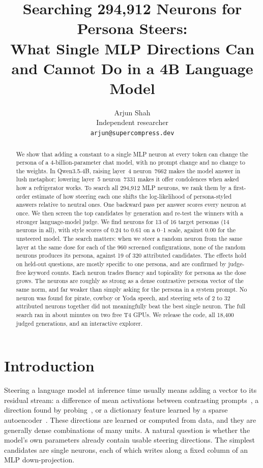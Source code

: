 \documentclass[11pt]{article}
\title{\textbf{Searching 294,912 Neurons for Persona Steers:}\\[2pt] What Single MLP Directions Can and Cannot Do in a 4B Language Model}
\author{Arjun Shah\\[2pt]\small Independent researcher\\\small\texttt{arjun@supercompress.dev}}
\date{}
\begin{document}
\maketitle

\begin{abstract}
We show that adding a constant to a single MLP neuron at every token can change the persona of a 4-billion-parameter chat model, with no prompt change and no change to the weights. In Qwen3.5-4B, raising layer~4 neuron~7662 makes the model answer in lush metaphor; lowering layer~5 neuron~7331 makes it offer condolences when asked how a refrigerator works. To search all 294,912 MLP neurons, we rank them by a first-order estimate of how steering each one shifts the log-likelihood of persona-styled answers relative to neutral ones. One backward pass per answer scores every neuron at once. We then screen the top candidates by generation and re-test the winners with a stronger language-model judge. We find neurons for 13 of 16 target personas (14 neurons in all), with style scores of 0.24 to 0.61 on a 0--1 scale, against 0.00 for the unsteered model. The search matters: when we steer a random neuron from the same layer at the same dose for each of the 960 screened configurations, none of the random neurons produces its persona, against 19 of 320 attributed candidates. The effects hold on held-out questions, are mostly specific to one persona, and are confirmed by judge-free keyword counts. Each neuron trades fluency and topicality for persona as the dose grows. The neurons are roughly as strong as a dense contrastive persona vector of the same norm, and far weaker than simply asking for the persona in a system prompt. No neuron was found for pirate, cowboy or Yoda speech, and steering sets of 2 to 32 attributed neurons together did not meaningfully beat the best single neuron. The full search ran in about \gpuMinutes{} minutes on two free T4 GPUs. We release the code, all 18,400 judged generations, and an interactive explorer.
\end{abstract}

\section{Introduction}

Steering a language model at inference time usually means adding a vector to its residual stream: a difference of mean activations between contrasting prompts~\citep{turner2023activation,rimsky2024steering,zou2023representation}, a direction found by probing~\citep{li2023inference}, or a dictionary feature learned by a sparse autoencoder~\citep{templeton2024scaling}. These directions are learned or computed from data, and they are generally dense combinations of many units. A natural question is whether the model's own parameters already contain usable steering directions. The simplest candidates are single neurons, each of which writes along a fixed column of an MLP down-projection.
\end{document}
